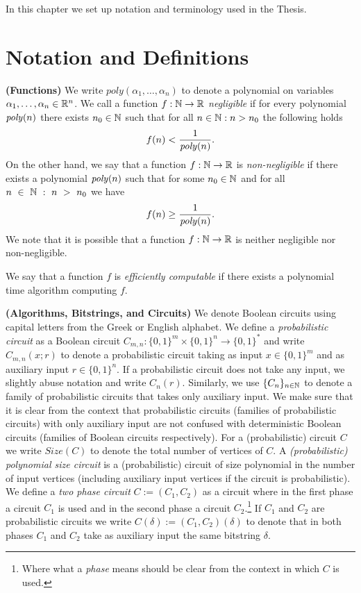%
%
In this chapter we set up notation and terminology used in the Thesis.
\section{Notation and Definitions}
\textbf{(Functions)}
We write $\mathit{poly}(\alpha_1, \dots, \alpha_n)$ to denote a polynomial on variables $\alpha_1, \dots, \alpha_n \in \mathbb{R}^n$.
We call a function $f: \mathbb{N} \rightarrow \mathbb{R}$ \textit{negligible} if for every polynomial $\operatorname{\mathit{poly}}(n)$
there exists $n_0 \in \mathbb{N}$ such that for all $n \in \mathbb{N} : n > n_0$ the following holds
\begin{align*}
f(n) < \frac{1}{\operatorname{\mathit{poly}}(n)}.
\end{align*}
On the other hand, we say that a function $f: \mathbb{N} \rightarrow \mathbb{R}$ is \textit{non-negligible} if
there exists a polynomial $\operatorname{\mathit{poly}}(n)$ such that for some $n_0 \in \mathbb{N}$ and for all $n~\in~\mathbb{N}~:~n~>~n_0$ we have
\begin{align*}
  f(n) \geq \frac{1}{\operatorname{\mathit{poly}}(n)}.
\end{align*}
We note that it is possible that a function $f:\mathbb{N} \rightarrow \mathbb{R}$ is neither negligible nor non-negligible.

We say that a function $f$ is \textit{efficiently computable} if there exists a polynomial time algorithm computing $f$.

\textbf{(Algorithms, Bitstrings, and Circuits)}
We denote Boolean circuits using capital letters from the Greek or English alphabet.
We define a \textit{probabilistic circuit} as a Boolean circuit $C_{m,n} : \{0,1\}^{m} \times \{0,1\}^{n} \rightarrow \{0,1\}^{*}$ and
write $C_{m,n}(x;r)$ to denote a probabilistic circuit taking as input  $x \in \{0,1\}^{m}$ and as auxiliary input $r \in \{0,1\}^{n}$.
If a probabilistic circuit does not take any input, we slightly abuse notation and write $C_{n}(r)$.
Similarly, we use $\{C_n\}_{n \in \mathbb{N}}$ to denote a family of probabilistic circuits that takes only auxiliary input.
We make sure that it is clear from the context that probabilistic circuits (families of probabilistic circuits) with only auxiliary input
are not confused with deterministic Boolean circuits (families of Boolean circuits respectively).
For a (probabilistic) circuit $C$ we write $\mathit{Size}(C)$ to denote the total number of vertices of $C$.
A \textit{(probabilistic) polynomial size circuit} is a (probabilistic) circuit of size polynomial in the number of input vertices
(including auxiliary input vertices if the circuit is probabilistic).
We define a \textit{two phase circuit} $C := (C_1, C_2)$ as a circuit where in the first phase a circuit $C_1$ is used and in the second phase a circuit $C_2$.\footnote{
Where what a \textit{phase} means should be clear from the context in which $C$ is used.}
If $C_1$ and $C_2$ are probabilistic circuits we write $C(\delta) := (C_1, C_2)(\delta)$ to denote that in both phases $C_1$ and $C_2$ take
as auxiliary input the same bitstring $\delta$.

